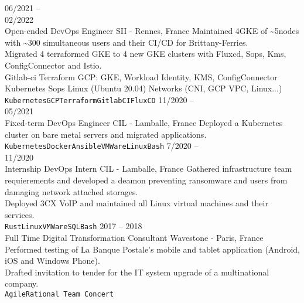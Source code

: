 \documentclass[10pt]{developercv} %
\begin{document}
\begin{entrylist}
	\entry
		{06/2021 --\\02/2022\\\footnotesize{Open-ended}}
		{DevOps Engineer}
		{SII - Rennes, France}
		{Maintained 4GKE of \textasciitilde5nodes with \textasciitilde300 simultaneous users and their CI/CD for Brittany-Ferries.\\
Migrated 4 terraformed GKE to 4 new GKE clusters with Fluxcd, Sops, Kms, ConfigConnector and Istio.\\
Gitlab-ci
Terraform
GCP: GKE, Workload Identity, KMS, ConfigConnector
Kubernetes
Sops
Linux (Ubuntu 20.04)
Networks (CNI, GCP VPC, Linux...)
		\texttt{Kubernetes}\slashsep\texttt{GCP}\slashsep\texttt{Terraform}\slashsep\texttt{GitlabCI}\slashsep\texttt{FluxCD}}
	\entry
		{11/2020 --\\05/2021\\\footnotesize{Fixed-term}}
		{DevOps Engineer}
		{CIL - Lamballe, France}
		{Deployed a Kubernetes cluster on bare metal servers and migrated applications.\\
		\texttt{Kubernetes}\slashsep\texttt{Docker}\slashsep\texttt{Ansible}\slashsep\texttt{VMWare}\slashsep\texttt{Linux}\slashsep\texttt{Bash}}
	\entry
		{7/2020 --\\11/2020\\\footnotesize{Internship}}
		{DevOps Intern}
		{CIL - Lamballe, France}
		{Gathered infrastructure team requierements and developed a deamon preventing ransomware and users from damaging network attached storages.\\
Deployed 3CX VoIP and maintained all Linux virtual machines and their services.\\
		\texttt{Rust}\slashsep\texttt{Linux}\slashsep\texttt{VMWare}\slashsep\texttt{SQL}\slashsep\texttt{Bash}}
	\entry
		{2017 -- 2018\\\footnotesize{Full Time}}
		{Digital Transformation Consultant}
		{Wavestone - Paris, France}
		{Performed testing of La Banque Postale's mobile and tablet application (Android, iOS and Windows Phone).\\Drafted invitation to tender for the IT system upgrade of a multinational company.\\ \texttt{Agile}\slashsep\texttt{Rational Team Concert}}
\end{entrylist}

\end{document}
